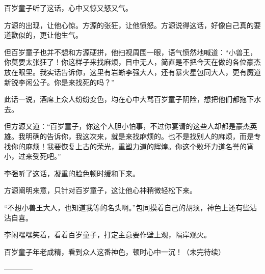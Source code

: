 \begin{this_body}
百岁童子听了这话，心中又惊又怒又气。

方源的出现，让他心惊。方源的张狂，让他愤怒。方源说得这话，好像自己真的要道歉似的，更让他生气。

但百岁童子也并不想和方源硬拼，他扫视周围一眼，语气愤然地喊道：“小兽王，你莫要太张狂了！你这样子来找麻烦，目中无人，简直是不把今天在做的各位豪杰放在眼里。我实话告诉你，这里有岩蜥李强大人，还有暴火星包同大人，更有魔道新锐李闲公子。你是来找死的吗？”

此话一说，酒席上众人纷纷变色，均在心中大骂百岁童子阴险，想把他们都拖下水去。

但方源又道：“百岁童子，你这个人胆小怕事，不过你宴请的这些人却都是豪杰英雄。我明确的告诉你，我这次来，就是来找麻烦的。也不是找别人的麻烦，而是专找你的麻烦！我要恢复上古的荣光，重塑力道的辉煌。你这个败坏力道名誉的宵小，过来受死吧。”

李强听了这话，凝重的脸色顿时缓和下来。

方源阐明来意，只针对百岁童子，这让他心神稍微轻松下来。

“不想小兽王大人，也知道我等的名头啊。”包同摸着自己的胡须，神色上还有些沾沾自喜。

李闲嘿嘿笑着，看着百岁童子，打定主意要作壁上观，隔岸观火。

百岁童子年老成精，看到众人这番神色，顿时心中一沉！（未完待续）

------------

\end{this_body}

